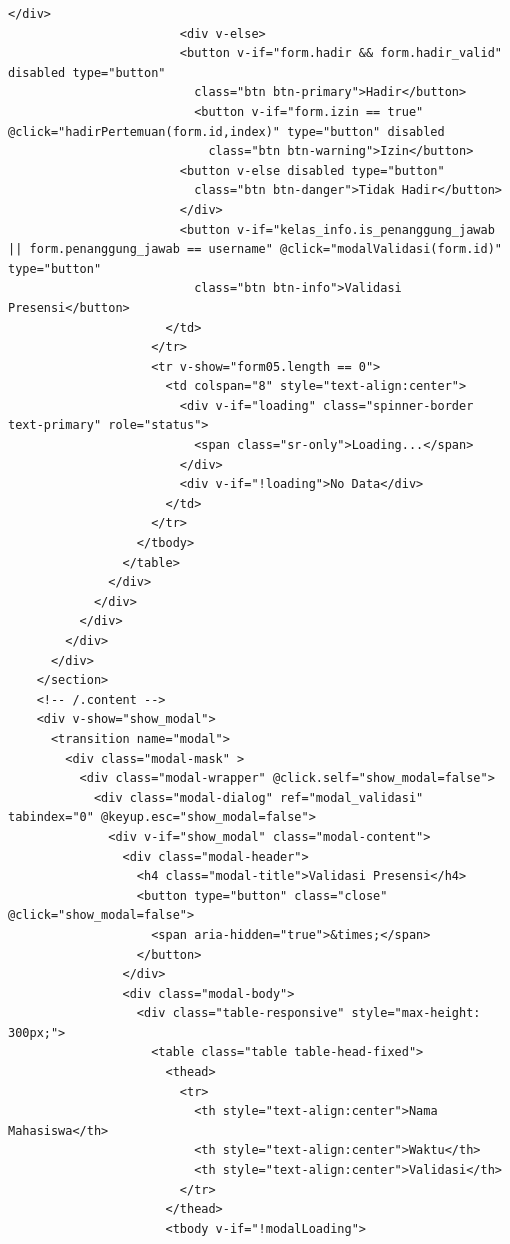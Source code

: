 \begin{lstlisting}[breaklines]
                        </div>
                        <div v-else>
                        <button v-if="form.hadir && form.hadir_valid" disabled type="button"
                          class="btn btn-primary">Hadir</button>
                          <button v-if="form.izin == true" @click="hadirPertemuan(form.id,index)" type="button" disabled
                            class="btn btn-warning">Izin</button>
                        <button v-else disabled type="button"
                          class="btn btn-danger">Tidak Hadir</button>
                        </div>
                        <button v-if="kelas_info.is_penanggung_jawab || form.penanggung_jawab == username" @click="modalValidasi(form.id)" type="button"
                          class="btn btn-info">Validasi Presensi</button>
                      </td>
                    </tr>
                    <tr v-show="form05.length == 0">
                      <td colspan="8" style="text-align:center">
                        <div v-if="loading" class="spinner-border text-primary" role="status">
                          <span class="sr-only">Loading...</span>
                        </div>
                        <div v-if="!loading">No Data</div>
                      </td>
                    </tr>
                  </tbody>
                </table>
              </div>
            </div>
          </div>
        </div>
      </div>
    </section>
    <!-- /.content -->
    <div v-show="show_modal">
      <transition name="modal">
        <div class="modal-mask" >
          <div class="modal-wrapper" @click.self="show_modal=false">
            <div class="modal-dialog" ref="modal_validasi" tabindex="0" @keyup.esc="show_modal=false">
              <div v-if="show_modal" class="modal-content">
                <div class="modal-header">
                  <h4 class="modal-title">Validasi Presensi</h4>
                  <button type="button" class="close" @click="show_modal=false">
                    <span aria-hidden="true">&times;</span>
                  </button>
                </div>
                <div class="modal-body">
                  <div class="table-responsive" style="max-height: 300px;">
                    <table class="table table-head-fixed">
                      <thead>
                        <tr>
                          <th style="text-align:center">Nama Mahasiswa</th>
                          <th style="text-align:center">Waktu</th>
                          <th style="text-align:center">Validasi</th>
                        </tr>
                      </thead>
                      <tbody v-if="!modalLoading">

\end{lstlisting}
